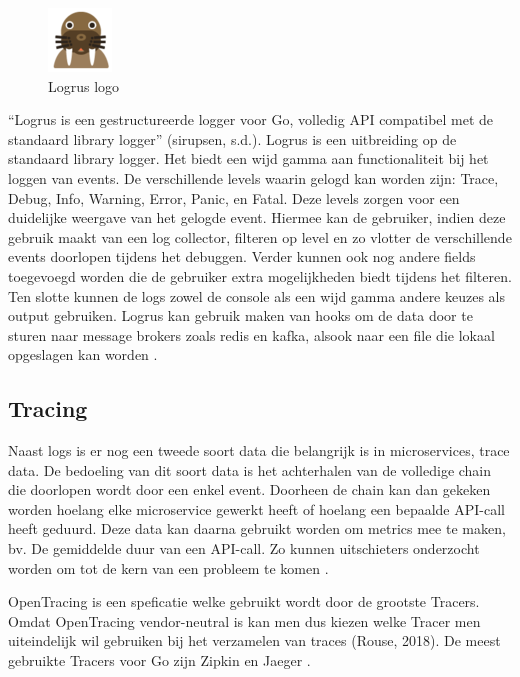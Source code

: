 \begin{figure}[ht]
    \centering
    \includegraphics[scale=1]{img/logrus-logo}
    \caption[Logrus logo]{Logrus logo \cite{sirupsen2014}}
\end{figure}

“Logrus is een gestructureerde logger voor Go, volledig API compatibel met de standaard library logger” (sirupsen, s.d.). Logrus is een uitbreiding op de standaard library logger. Het biedt een wijd gamma aan functionaliteit bij het loggen van events. De verschillende levels waarin gelogd kan worden zijn: Trace, Debug, Info, Warning, Error, Panic, en Fatal. Deze levels zorgen voor een duidelijke weergave van het gelogde event. Hiermee kan de gebruiker, indien deze gebruik maakt van een log collector, filteren op level en zo vlotter de verschillende events doorlopen tijdens het debuggen. Verder kunnen ook nog andere fields toegevoegd worden die de gebruiker extra mogelijkheden biedt tijdens het filteren. Ten slotte kunnen de logs zowel de console als een wijd gamma andere keuzes als output gebruiken. Logrus kan gebruik maken van hooks om de data door te sturen naar message brokers zoals redis en kafka, alsook naar een file die lokaal opgeslagen kan worden \autocite{sirupsen2014}.

\subsection{Tracing}

Naast logs is er nog een tweede soort data die belangrijk is in microservices, trace data. De bedoeling van dit soort data is het achterhalen van de volledige chain die doorlopen wordt door een enkel event. Doorheen de chain kan dan gekeken worden hoelang elke microservice gewerkt heeft of hoelang een bepaalde API-call heeft geduurd. Deze data kan daarna gebruikt worden om metrics mee te maken, bv. De gemiddelde duur van een API-call. Zo kunnen uitschieters onderzocht worden om tot de kern van een probleem te komen \autocite{Rouse2018}.

OpenTracing is een speficatie welke gebruikt wordt door de grootste Tracers. Omdat OpenTracing vendor-neutral is kan men dus kiezen welke Tracer men uiteindelijk wil gebruiken bij het verzamelen van traces (Rouse, 2018). De meest gebruikte Tracers voor Go zijn Zipkin en Jaeger \autocite{Sabic2018}.

